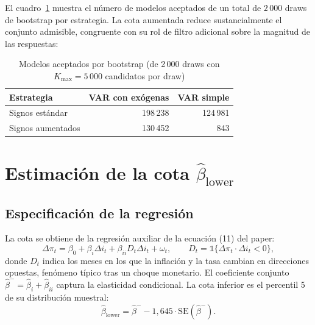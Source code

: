 \documentclass[11pt,letterpaper]{article}
\begin{document}
El cuadro~\ref{tab:aceptacion} muestra el número de modelos aceptados de un total de $2\,000$ draws de bootstrap por estrategia. La cota aumentada reduce sustancialmente el conjunto admisible, congruente con su rol de filtro adicional sobre la magnitud de las respuestas:

\begin{table}[H]
\centering
\caption{Modelos aceptados por bootstrap (de 2\,000 draws con $K_{\max}=5\,000$ candidatos por draw)}
\label{tab:aceptacion}
\small
\begin{tabular}{@{}lrr@{}}
\toprule
\textbf{Estrategia} & \textbf{VAR con exógenas} & \textbf{VAR simple} \\
\midrule
Signos estándar    & 198\,238 & 124\,981 \\
Signos aumentados  & 130\,452 & \;\;62\,843 \\
\bottomrule
\end{tabular}
\end{table}

\section{Estimación de la cota \texorpdfstring{$\hat\beta_{\text{lower}}$}{beta lower}}\label{sec:beta_lower}

\subsection{Especificación de la regresión}

La cota se obtiene de la regresión auxiliar de la ecuación (11) del paper:
\begin{equation}
\Delta \pi_t = \beta_0 + \beta_i \Delta i_t + \beta_{ii} D_t \Delta i_t + \omega_t,
\qquad D_t = \mathbb{1}\{\Delta \pi_t \cdot \Delta i_t < 0\},
\label{eq:reg_beta_lower}
\end{equation}
donde $D_t$ indica los meses en los que la inflación y la tasa cambian en direcciones opuestas, fenómeno típico tras un choque monetario. El coeficiente conjunto $\hat\beta^- = \hat\beta_i + \hat\beta_{ii}$ captura la elasticidad condicional. La cota inferior es el percentil 5 de su distribución muestral:
\begin{equation}
\hat\beta_{\text{lower}} = \hat\beta^- - 1{,}645 \cdot \mathrm{SE}(\hat\beta^-).
\label{eq:beta_lower_def}
\end{equation}
\end{document}
